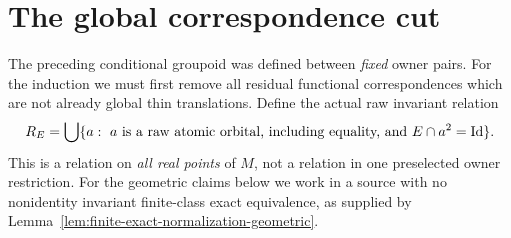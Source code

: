 \section{The global correspondence cut}\label{sec:correspondence-cut}

The preceding conditional groupoid was defined between \emph{fixed}
owner pairs.  For the induction we must first remove all residual
functional correspondences which are not already global thin
translations.  Define the actual raw invariant relation
\begin{equation}\label{eq:global-correspondence}
 R_E=\bigcup\{a:\ a\text{ is a raw atomic orbital, including
 equality, and }E\cap a^2=\mathrm{Id}\}.
\end{equation}
This is a relation on \emph{all real points} of $M$, not a relation
in one preselected owner restriction.  For the geometric claims below we work in a source with no
nonidentity invariant finite-class exact equivalence, as supplied
by Lemma~\ref{lem:finite-exact-normalization-geometric}.

